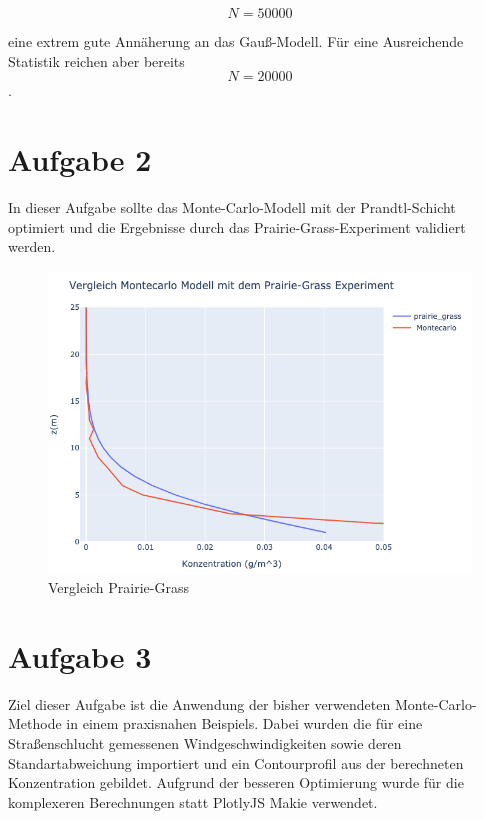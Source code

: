 \documentclass[ngerman]{scrartcl}
\begin{document}
\begin{equation}
	N=50000
\end{equation}

eine extrem gute Annäherung an das Gauß-Modell. Für eine Ausreichende Statistik reichen aber bereits 
\begin{equation}
	N=20000
\end{equation}.
\section{Aufgabe 2}
In dieser Aufgabe sollte das Monte-Carlo-Modell mit der Prandtl-Schicht optimiert und die Ergebnisse durch das Prairie-Grass-Experiment validiert werden.
\begin{figure}[H]
	\centering
	\includegraphics[scale=0.5]{Bilder/2back.png}
	\caption{Vergleich Prairie-Grass}
	\label{fig:my_label}
\end{figure}
\section{Aufgabe  3}
Ziel dieser Aufgabe ist die Anwendung der bisher verwendeten Monte-Carlo-Methode in einem praxisnahen Beispiels. Dabei wurden die für eine Straßenschlucht gemessenen Windgeschwindigkeiten sowie deren Standartabweichung importiert und ein Contourprofil aus der berechneten Konzentration gebildet. Aufgrund der besseren Optimierung wurde für die komplexeren Berechnungen statt PlotlyJS  Makie verwendet.
\end{document}
